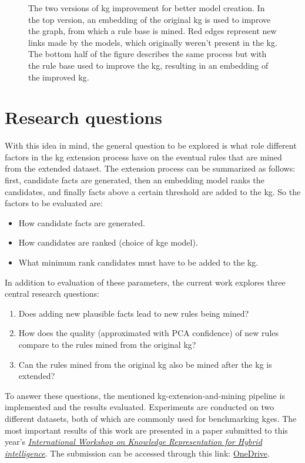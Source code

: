 \begin{figure}[H]
    \centering
    
    \caption[Figure representing the process.]{The two versions of \gls{kg} improvement for better model creation. In the top version, an embedding of the original \gls{kg} is used to improve the graph, from which a rule base is mined. Red edges represent new links made by the models, which originally weren't present in the \gls{kg}. The bottom half of the figure describes the same process but with the rule base used to improve the \gls{kg}, resulting in an embedding of the improved \gls{kg}.}
    \label{rule_based_and_embedding}
\end{figure}

\section{Research questions}
With this idea in mind, the general question to be explored is what role different factors in the \gls{kg} extension process have on the eventual rules that are mined from the extended dataset. The extension process can be summarized as follows: first, candidate facts are generated, then an embedding model ranks the candidates, and finally facts above a certain threshold are added to the \gls{kg}. So the factors to be evaluated are:
\begin{itemize}
    \item How candidate facts are generated.
    \item How candidates are ranked (choice of \gls{kge} model).
    \item What minimum rank candidates must have to be added to the \gls{kg}.
\end{itemize}

In addition to evaluation of these parameters, the current work explores three central research questions:
\begin{enumerate}
    \item Does adding new plausible facts lead to new rules being mined?
    \item How does the quality (approximated with PCA confidence) of new rules compare to the rules mined from the original \gls{kg}?
    \item Can the rules mined from the original \gls{kg} also be mined after the \gls{kg} is extended?
\end{enumerate}

To answer these questions, the mentioned \gls{kg}-extension-and-mining pipeline is implemented and the results evaluated. Experiments are conducted on two different datasets, both of which are commonly used for benchmarking \glspl{kge}. The most important results of this work are presented in a paper submitted to this year's \href{https://sites.google.com/view/kr4hi/home}{\textit{International Workshop on Knowledge Representation for Hybrid intelligence}}. The submission can be accessed through this link: \href{https://1drv.ms/b/s!AmqWMjPoErw-lIMSvmZOPIGrHn4l-g?e=MYpkuS}{OneDrive}.

